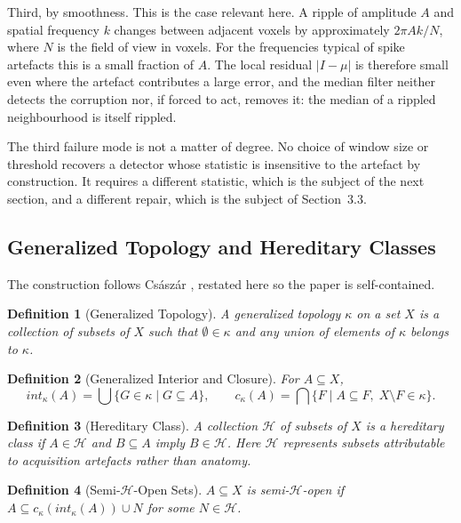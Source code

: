 \documentclass[12pt]{article}
\newtheorem{definition}{Definition}[section]
\theoremstyle{definition}
\theoremstyle{plain}
\begin{document}
Third, by smoothness. This is the case relevant here. A ripple of amplitude $A$ and
spatial frequency $k$ changes between adjacent voxels by approximately $2\pi A k / N$,
where $N$ is the field of view in voxels. For the frequencies typical of spike
artefacts this is a small fraction of $A$. The local residual $|I - \mu|$ is
therefore small even where the artefact contributes a large error, and the median
filter neither detects the corruption nor, if forced to act, removes it: the median
of a rippled neighbourhood is itself rippled.

The third failure mode is not a matter of degree. No choice of window size or
threshold recovers a detector whose statistic is insensitive to the artefact by
construction. It requires a different statistic, which is the subject of the next
section, and a different repair, which is the subject of Section~3.3.

\subsection{Generalized Topology and Hereditary Classes}

The construction follows Cs\'asz\'ar \cite{csaszar2002}, restated here so the paper
is self-contained.

\begin{definition}[Generalized Topology]
A generalized topology $\kappa$ on a set $X$ is a collection of subsets of $X$ such
that $\emptyset \in \kappa$ and any union of elements of $\kappa$ belongs to
$\kappa$.
\end{definition}

\begin{definition}[Generalized Interior and Closure]
For $A \subseteq X$,
\begin{equation}
    int_\kappa(A) = \bigcup \{ G \in \kappa \mid G \subseteq A \},
    \qquad
    c_\kappa(A) = \bigcap \{ F \mid A \subseteq F,\; X \setminus F \in \kappa \}.
\end{equation}
\end{definition}

\begin{definition}[Hereditary Class]
A collection $\mathcal{H}$ of subsets of $X$ is a hereditary class if $A \in
\mathcal{H}$ and $B \subseteq A$ imply $B \in \mathcal{H}$. Here $\mathcal{H}$
represents subsets attributable to acquisition artefacts rather than anatomy.
\end{definition}

\begin{definition}[Semi-$\mathcal{H}$-Open Sets]
$A \subseteq X$ is semi-$\mathcal{H}$-open if
$A \subseteq c_\kappa(int_\kappa(A)) \cup N$ for some $N \in \mathcal{H}$.
\end{definition}
\end{document}
